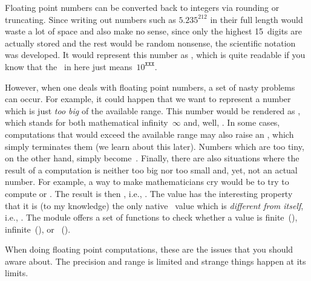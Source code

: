 Floating point numbers can be converted back to integers via rounding or truncating.
Since writing out numbers such as $5.235^{212}$ in their full length would waste a lot of space and also make no sense, since only the highest 15~digits are actually stored and the rest would be random nonsense, the scientific notation was developed.
It would represent this number as , which is quite readable if you know that the~ in  here just means~$10^{\mathtt{XXX}}$.

However, when one deals with floating point numbers, a set of nasty problems can occur.
For example, it could happen that we want to represent a number which is just \emph{too big} of the available range.
This number would be rendered as , which stands for both mathematical infinity~$\infty$ and, well, .
In some cases, computations that would exceed the available range may also raise an , which simply terminates them (we learn about this later).
Numbers which are too tiny, on the other hand, simply become~.
Finally, there are also situations where the result of a computation is neither too big nor too small and, yet, not an actual number.
For example, a way to make mathematicians cry would be to try to compute  or .
The result is then , i.e., .
The value  has the interesting property that it is (to my knowledge) the only native \python\ value which is \emph{different from itself}, i.e., .
The  module offers a set of functions to check whether a value is finite~(), infinite~(), or ~().

When doing floating point computations, these are the issues that you should aware about.
The precision and range is limited and strange things happen at its limits.%
%
\endhsection%
%
\endhsection%
%

